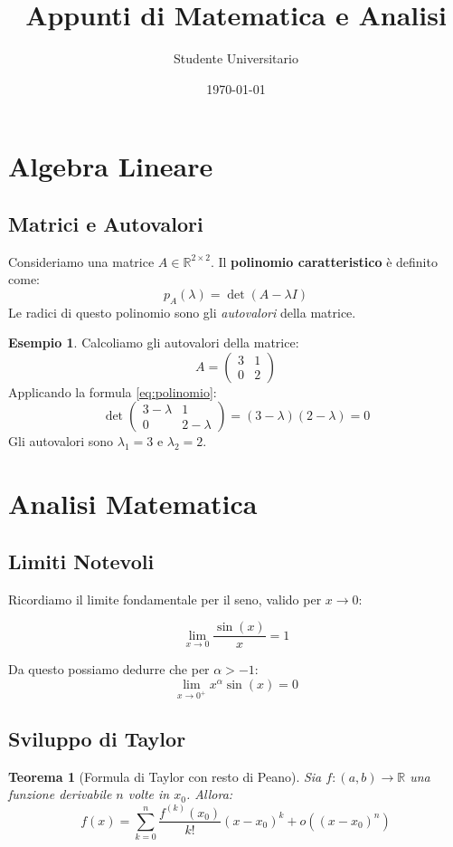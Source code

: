 \documentclass[a4paper, 12pt]{article}
\title{\textbf{Appunti di Matematica e Analisi}}
\author{Studente Universitario}
\date{\today}
\newtheorem{teorema}{Teorema}
\theoremstyle{definition}
\newtheorem{esempio}{Esempio}
\begin{document}
\maketitle %
\tableofcontents %
\newpage

\section{Algebra Lineare}

\subsection{Matrici e Autovalori}
Consideriamo una matrice $A \in \mathbb{R}^{2 \times 2}$. Il \textbf{polinomio caratteristico} è definito come:
\begin{equation} \label{eq:polinomio}
    p_A(\lambda) = \det(A - \lambda I)
\end{equation}
Le radici di questo polinomio sono gli \emph{autovalori} della matrice.

\begin{esempio}
Calcoliamo gli autovalori della matrice:
$$ A = \begin{pmatrix} 3 & 1 \\ 0 & 2 \end{pmatrix} $$
Applicando la formula \eqref{eq:polinomio}:
$$ \det \begin{pmatrix} 3-\lambda & 1 \\ 0 & 2-\lambda \end{pmatrix} = (3-\lambda)(2-\lambda) = 0 $$
Gli autovalori sono $\lambda_1 = 3$ e $\lambda_2 = 2$.
\end{esempio}

\section{Analisi Matematica}

\subsection{Limiti Notevoli}
Ricordiamo il limite fondamentale per il seno, valido per $x \to 0$:

$$ \lim_{x \to 0} \frac{\sin(x)}{x} = 1 $$

Da questo possiamo dedurre che per $\alpha > -1$:
$$ \lim_{x \to 0^+} x^\alpha \sin(x) = 0 $$

\subsection{Sviluppo di Taylor}
\begin{teorema}[Formula di Taylor con resto di Peano]
Sia $f: (a,b) \to \mathbb{R}$ una funzione derivabile $n$ volte in $x_0$. Allora:
$$ f(x) = \sum_{k=0}^n \frac{f^{(k)}(x_0)}{k!} (x-x_0)^k + o((x-x_0)^n) $$
\end{teorema}
\end{document}
